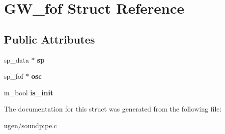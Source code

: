 \hypertarget{structGW__fof}{}\section{G\+W\+\_\+fof Struct Reference}
\label{structGW__fof}
\subsection*{Public Attributes}
\begin{DoxyCompactItemize}
\item 
\hypertarget{structGW__fof_ab32c64ae4431ed9fabdffd9fa547a8bd}{}\label{structGW__fof_ab32c64ae4431ed9fabdffd9fa547a8bd} 
sp\+\_\+data $\ast$ {\bfseries sp}
\item 
\hypertarget{structGW__fof_a1eb9de0d1e95bad4ebd00d10b6a974bf}{}\label{structGW__fof_a1eb9de0d1e95bad4ebd00d10b6a974bf} 
sp\+\_\+fof $\ast$ {\bfseries osc}
\item 
\hypertarget{structGW__fof_a680295bdb1a86e753e60307616ec3771}{}\label{structGW__fof_a680295bdb1a86e753e60307616ec3771} 
m\+\_\+bool {\bfseries is\+\_\+init}
\end{DoxyCompactItemize}


The documentation for this struct was generated from the following file\+:\begin{DoxyCompactItemize}
\item 
ugen/soundpipe.\+c\end{DoxyCompactItemize}
